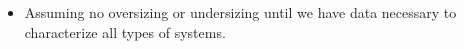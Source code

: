 \begin{itemize}
\item Assuming no oversizing or undersizing until we have data necessary to characterize all types of systems.
\end{itemize}
